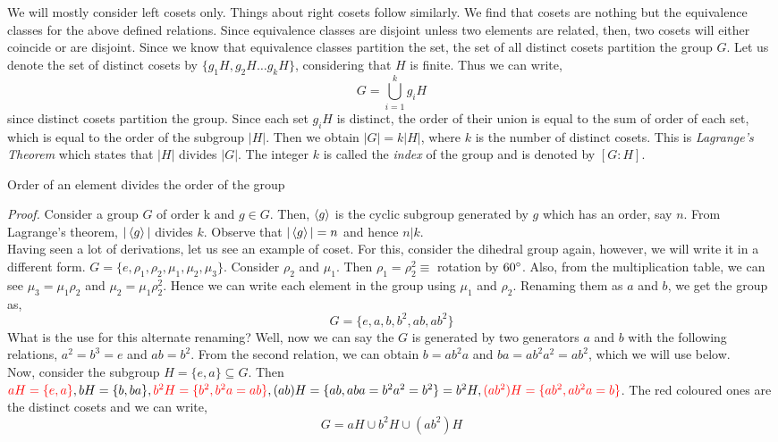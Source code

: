 We will mostly consider left cosets only. Things about right cosets follow similarly. We find that cosets are nothing but the equivalence classes for the above defined relations. Since equivalence classes are disjoint unless two elements are related, then, two cosets will either coincide or are disjoint. Since we know that equivalence classes partition the set, the set of all distinct cosets partition the group $G$. Let us denote the set of distinct cosets by $\{g_1 H, g_2H\ldots g_kH\}$, considering that $H$ is finite. Thus we can write, 
$$G = \bigcup\limits_{i=1}^k g_iH$$ 
since distinct cosets partition the group. Since each set $g_iH$ is distinct, the order of their union is equal to the sum of order of each set, which is equal to the order of the subgroup $|H|$. Then we obtain $|G| = k |H|$, where $k$ is the number of distinct cosets. This is \textit{Lagrange's Theorem} which states that $|H|$ divides $|G|$. The integer $k$ is called the \textit{index} of the group and is denoted by $[G:H]$.
\begin{lemma}
    Order of an element divides the order of the group
\end{lemma}
\noindent
\textit{Proof.} Consider a group $G$ of order k and $g\in G$. Then, $\left\langle g \right\rangle$ is the cyclic subgroup generated by $g$ which has an order, say $n$. From Lagrange's theorem, $|\left\langle g \right\rangle|$ divides $k$. Observe that $|\left\langle g \right\rangle| = n$ and hence $n|k$. \\[0.2cm]
Having seen a lot of derivations, let us see an example of coset. For this, consider the dihedral group again, however, we will write it in a different form. $G=\{e, \rho_1, \rho_2, \mu_1, \mu_2, \mu_3\}$. Consider $\rho_2$ and $\mu_1$. Then $\rho_1 = \rho_2^2 \equiv $ rotation by $60\degree$. Also, from the multiplication table, we can see $\mu_3 = \mu_1\rho_2$ and $\mu_2 = \mu_1\rho_2^2$. Hence we can write each element in the group using $\mu_1$ and $\rho_2$. Renaming them as $a$ and $b$, we get the group as, 
$$G=\{e,a,b,b^2,ab,ab^2\}$$
What is the use for this alternate renaming? Well, now we can say the $G$ is generated by two generators $a$ and $b$ with the following relations, $a^2=b^3=e$ and $ab = b^2$. From the second relation, we can obtain $b = ab^2 a$ and $ba = ab^2a^2=ab^2$, which we will use below.\\[0.2cm]
Now, consider the subgroup $H= \{e,a\} \subseteq G$. Then $\mathcolor{red}{aH = \{e,a\}},bH = \{b,ba\},\mathcolor{red}{b^2H = \{b^2,b^2a=ab\}},(ab)H = \{ab,aba=b^2a^2=b^2\}=b^2H,\mathcolor{red}{(ab^2)H = \{ab^2,ab^2a=b\}}$. The red coloured ones are the distinct cosets and we can write, 
$$G = aH \cup b^2H\cup (ab^2)H $$
